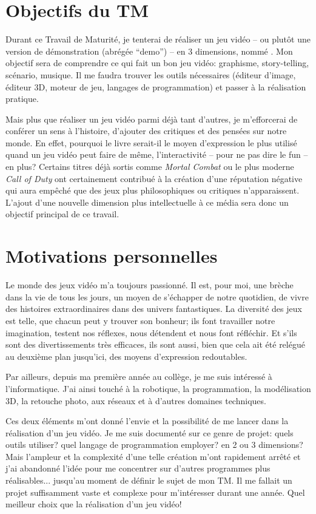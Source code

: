 \printMiniToc


\section{Objectifs du TM}
\label{sec:objectifsTM}
Durant ce Travail de Maturité, je tenterai de réaliser un  jeu vidéo -- ou plutôt une version de démonstration (abrégée \enquote{demo}) -- en 3 dimensions, nommé \nomJeu. Mon objectif sera de comprendre ce qui fait un bon jeu vidéo: graphisme, story-telling, scénario, musique. Il me faudra trouver les outils nécessaires (éditeur d'image, éditeur 3D, moteur de jeu, langages de programmation) et passer à la réalisation pratique.

Mais plus que réaliser un jeu vidéo parmi déjà tant d'autres, je m'efforcerai de conférer un sens à l'histoire, d'ajouter des critiques et des pensées sur notre monde. En effet, pourquoi le livre serait-il le moyen d'expression le plus utilisé quand un jeu vidéo peut faire de même, l'interactivité -- pour ne pas dire le fun -- en plus? Certains titres déjà sortis comme \textit{Mortal Combat} ou le plus moderne \textit{Call of Duty} ont certainement contribué à la création d'une réputation négative qui aura empêché que des jeux plus philosophiques ou critiques n'apparaissent. L'ajout d'une nouvelle dimension plus intellectuelle à ce média sera donc un objectif principal de ce travail.



\section{Motivations personnelles}
Le monde des jeux vidéo m'a toujours passionné. Il est, pour moi, une brèche dans la vie de tous les jours, un moyen de s'échapper de notre quotidien, de vivre des histoires extraordinaires dans des univers fantastiques. La diversité des jeux est telle, que chacun peut y trouver son bonheur; ils font travailler notre imagination, testent nos réflexes, nous détendent et nous font réfléchir. Et s'ils sont des divertissements très efficaces, ils sont aussi, bien que cela ait été relégué au deuxième plan jusqu'ici, des moyens d'expression redoutables.

Par ailleurs, depuis ma première année au collège, je me suis intéressé à l'informatique. J'ai ainsi touché à la robotique, la programmation, la modélisation 3D, la retouche photo, aux réseaux et à d'autres domaines techniques.

Ces deux éléments m'ont donné l'envie et la possibilité de me lancer dans la réalisation d'un jeu vidéo. Je me suis documenté sur ce genre de projet: quels outils utiliser? quel langage de programmation employer? en 2 ou 3 dimensions? Mais l'ampleur et la complexité d'une telle création m'ont rapidement arrêté et j'ai abandonné l'idée pour me concentrer sur d'autres programmes plus réalisables... jusqu'au moment de définir le sujet de mon TM. Il me fallait un projet suffisamment vaste et complexe pour m'intéresser durant une année. Quel meilleur choix que la réalisation d'un jeu vidéo!



